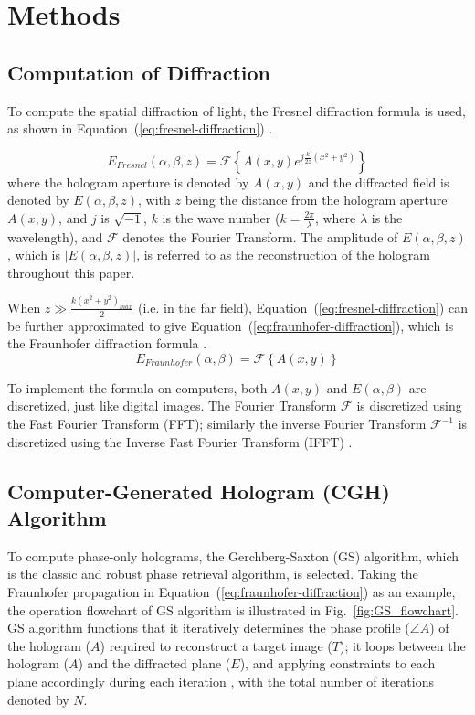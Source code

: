 \section{Methods}
\subsection{Computation of Diffraction}
	To compute the spatial diffraction of light, the Fresnel diffraction formula is used, as shown in Equation~(\ref{eq:fresnel-diffraction}) \cite{Goodman2017}.

	\begin{equation}
	  E_{Fresnel}(\alpha, \beta, z) = \mathcal{F} \left\{A(x,y)e^{j\frac{k}{2z}(x^2+y^2)}\right\}
	  \label{eq:fresnel-diffraction}
	\end{equation}
	where the hologram aperture is denoted by $A(x, y)$ and the diffracted field is denoted by $E(\alpha, \beta, z)$, with $z$ being the distance from the hologram aperture $A(x, y)$, and $j$ is $\sqrt{-1}$, $k$ is the wave number ($k=\frac{2\pi}{\lambda}$, where $\lambda$ is the wavelength), and $\mathcal{F}$ denotes the Fourier Transform. The amplitude of $E(\alpha, \beta, z)$, which is $|E(\alpha, \beta, z)|$, is referred to as the reconstruction of the hologram throughout this paper.

	When $z\gg \frac{k(x^2+y^2)_{max}}{2}$ (i.e. in the far field), Equation~(\ref{eq:fresnel-diffraction}) can be further approximated to give Equation~(\ref{eq:fraunhofer-diffraction}), which is the Fraunhofer diffraction formula \cite{Goodman2017}.
	\begin{equation}
	  E_{Fraunhofer}(\alpha, \beta) = \mathcal{F} \left\{A(x,y)\right\}
	  \label{eq:fraunhofer-diffraction}
	\end{equation}

	To implement the formula on computers, both $A(x, y)$ and $E(\alpha, \beta)$ are discretized, just like digital images. The Fourier Transform $\mathcal{F}$ is discretized using the Fast Fourier Transform (FFT); similarly the inverse Fourier Transform $\mathcal{F}^{-1}$ is discretized using the Inverse Fast Fourier Transform (IFFT) \cite{Cochran1967}.


\subsection{Computer-Generated Hologram (CGH) Algorithm}
	To compute phase-only holograms, the Gerchberg-Saxton (GS) \cite{Gerchberg1972} algorithm, which is the classic and robust phase retrieval algorithm, is selected. Taking the Fraunhofer propagation in Equation~(\ref{eq:fraunhofer-diffraction}) as an example, the operation flowchart of GS algorithm is illustrated in Fig.~\ref{fig:GS_flowchart}. GS algorithm functions that it iteratively determines the phase profile ($\angle A$) of the hologram ($A$) required to reconstruct a target image ($T$); it loops between the hologram ($A$) and the diffracted plane ($E$), and applying constraints to each plane accordingly during each iteration \cite{Gerchberg1972}, with the total number of iterations denoted by $N$.

